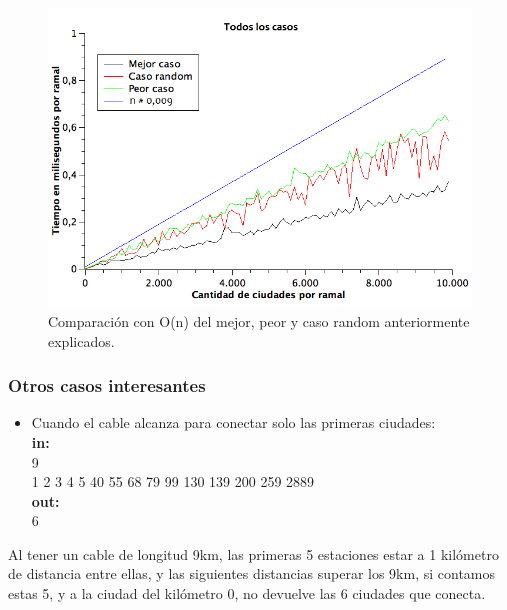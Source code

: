 \begin{figure}[H]
\begin{center}

  \includegraphics[width=\linewidth]{../graficos/ej1/TodosLosCasos.png}
  \caption{{\small Comparación con O(n) del mejor, peor y caso random anteriormente explicados. }} \label{ej1-todos}
\endminipage

\end{center}
\end{figure}


\subsubsection{Otros casos interesantes}
\begin{itemize}
\item Cuando el cable alcanza para conectar solo las primeras ciudades:\\
\textbf{in:}\\
9\\
1 2 3 4 5 40 55 68 79 99 130 139 200 259 2889\\
\textbf{out:}\\
6\\

\end{itemize}

Al tener un cable de longitud 9km, las primeras 5 estaciones estar a 1 kilómetro de distancia entre ellas, y las siguientes distancias superar los 9km, si contamos estas 5, y a la ciudad del kilómetro 0, no devuelve las 6 ciudades que conecta.\\

